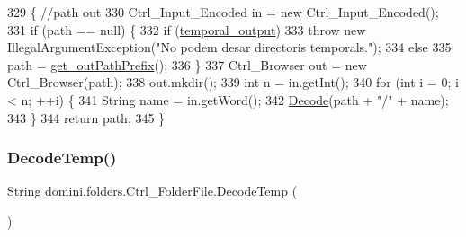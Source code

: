 \begin{DoxyCode}
329                                              \{ \textcolor{comment}{//path out }
330         Ctrl\_Input\_Encoded in = \textcolor{keyword}{new} Ctrl\_Input\_Encoded();
331         \textcolor{keywordflow}{if} (path == null) \{
332             \textcolor{keywordflow}{if} (\hyperlink{classdomini_1_1folders_1_1Ctrl__FolderFile_a0db81590abe27b21a9b8c37633c86fa6}{temporal\_output})
333                 \textcolor{keywordflow}{throw} \textcolor{keyword}{new} IllegalArgumentException(\textcolor{stringliteral}{"No podem desar directoris temporals."});
334             \textcolor{keywordflow}{else}
335                 path = \hyperlink{classdomini_1_1folders_1_1Ctrl__FolderFile_a11c6b1b4a25d12b8091c7c96b3da1ea7}{get\_outPathPrefix}();
336         \}
337         Ctrl\_Browser out = \textcolor{keyword}{new} Ctrl\_Browser(path);
338         out.mkdir();
339         \textcolor{keywordtype}{int} n = in.getInt();
340         \textcolor{keywordflow}{for} (\textcolor{keywordtype}{int} i = 0; i < n; ++i) \{
341             String name = in.getWord();
342             \hyperlink{classdomini_1_1folders_1_1Ctrl__FolderFile_a5d28ac7f5223ecd40a242148e86447c1}{Decode}(path + \textcolor{stringliteral}{"/"} + name);
343         \}
344         \textcolor{keywordflow}{return} path;
345     \}
\end{DoxyCode}
\mbox{\label{classdomini_1_1folders_1_1Ctrl__FolderFile_afa0f6968113855feccccfdbacc00444e}} 
\subsubsection{\texorpdfstring{Decode\+Temp()}{DecodeTemp()}}
{\footnotesize\ttfamily String domini.\+folders.\+Ctrl\+\_\+\+Folder\+File.\+Decode\+Temp (\begin{DoxyParamCaption}{ }\end{DoxyParamCaption})\hspace{0.3cm}{\ttfamily [inline]}}



